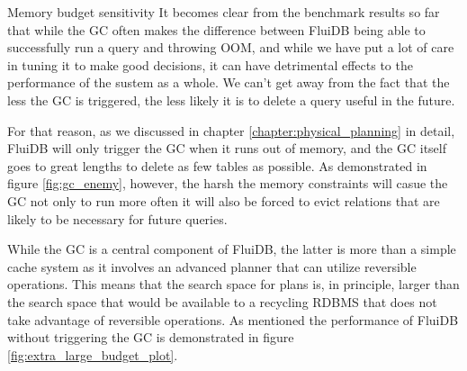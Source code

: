 \begin{corrected}{Memory budget sensitivity}
  It becomes clear from the benchmark results so far that while the GC
  often makes the difference between FluiDB being able to successfully
  run a query and throwing OOM, and while we have put a lot of care in
  tuning it to make good decisions, it can have detrimental effects to
  the performance of the sustem as a whole. We can't get away from the
  fact that the less the GC is triggered, the less likely it is to
  delete a query useful in the future.

  For that reason, as we discussed in chapter
  \ref{chapter:physical_planning} in detail, FluiDB will only trigger
  the GC when it runs out of memory, and the GC itself goes to great
  lengths to delete as few tables as possible. As demonstrated in
  figure \ref{fig:gc_enemy}, however, the harsh the memory constraints
  will casue the GC not only to run more often it will also be forced
  to evict relations that are likely to be necessary for future
  queries.

  While the GC is a central component of FluiDB, the latter is more than
  a simple cache system as it involves an advanced planner that can
  utilize reversible operations. This means that the search space for
  plans is, in principle, larger than the search space that would be
  available to a recycling RDBMS that does not take advantage of
  reversible operations. As mentioned the performance of FluiDB without
  triggering the GC is demonstrated in figure
  \ref{fig:extra_large_budget_plot}.
\end{corrected}



